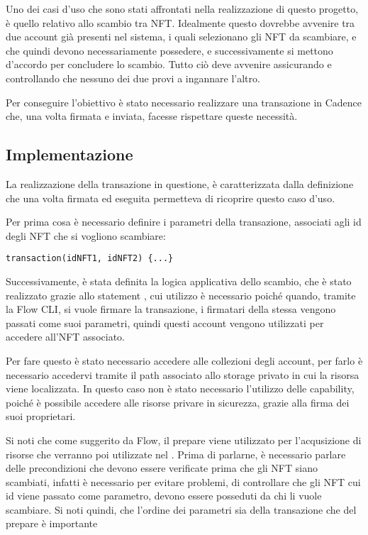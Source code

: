 Uno dei casi d'uso che sono stati affrontati nella realizzazione di questo progetto, è quello relativo allo scambio tra NFT. Idealmente questo dovrebbe avvenire tra due account già presenti nel sistema, i quali selezionano gli NFT da scambiare, e che quindi devono necessariamente possedere, e successivamente si mettono d'accordo per concludere lo scambio. Tutto ciò deve avvenire assicurando e controllando che nessuno dei due provi a ingannare l'altro.

Per conseguire l'obiettivo è stato necessario realizzare una transazione in Cadence che, una volta firmata e inviata, facesse rispettare queste necessità.

\subsection{Implementazione}

La realizzazione della transazione in questione, è caratterizzata dalla definizione che una volta firmata ed eseguita permetteva di ricoprire questo caso d'uso.

Per prima cosa è necessario definire i parametri della transazione, associati agli id degli NFT che si vogliono scambiare:

\begin{lstlisting}[style=all, style=cadence]
transaction(idNFT1, idNFT2) {...}
\end{lstlisting}

Successivamente, è stata definita la logica applicativa dello scambio, che è stato realizzato grazie allo statement , cui utilizzo è necessario poiché quando, tramite la Flow CLI, si vuole firmare la transazione, i firmatari della stessa vengono passati come suoi parametri, quindi questi account vengono utilizzati per accedere all'NFT associato. 

Per fare questo è stato necessario accedere alle collezioni degli account, per farlo è necessario accedervi tramite il path associato allo storage privato in cui la risorsa viene localizzata. In questo caso non è stato necessario l'utilizzo delle capability, poiché è possibile accedere alle risorse privare in sicurezza, grazie alla firma dei suoi proprietari.


Si noti che come suggerito da Flow, il prepare viene utilizzato per l'acqusizione di risorse che verranno poi utilizzate nel . Prima di parlarne, è necessario parlare delle precondizioni che devono essere verificate prima che gli NFT siano scambiati, infatti è necessario per evitare problemi, di controllare che gli NFT cui id viene passato come parametro, devono essere posseduti da chi li vuole scambiare. Si noti quindi, che l'ordine dei parametri sia della transazione che del prepare è importante

